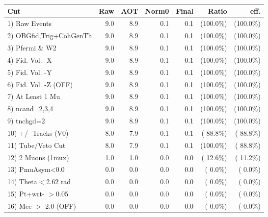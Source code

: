  \begin{table}[h!]\centering
 \begin{tabular}{||l||r|r|r|r|r|r||}
 \hline
 \hline
 Cut & Raw & AOT & Norm0 & Final & Ratio & eff.       \\
 \hline
  1) Raw Events           &          9.0 &          8.9 &          0.1 &          0.1 & (100.0\%) & (100.0\%) \\
  2) OBGfid,Trig+CohGenTh &          9.0 &          8.9 &          0.1 &          0.1 & (100.0\%) & (100.0\%) \\
  3) Pfermi \& W2         &          9.0 &          8.9 &          0.1 &          0.1 & (100.0\%) & (100.0\%) \\
  4) Fid. Vol. -X         &          9.0 &          8.9 &          0.1 &          0.1 & (100.0\%) & (100.0\%) \\
  5) Fid. Vol. -Y         &          9.0 &          8.9 &          0.1 &          0.1 & (100.0\%) & (100.0\%) \\
  6) Fid. Vol. -Z (OFF)   &          9.0 &          8.9 &          0.1 &          0.1 & (100.0\%) & (100.0\%) \\
  7) At Least 1 Mu        &          9.0 &          8.9 &          0.1 &          0.1 & (100.0\%) & (100.0\%) \\
  8) ncand=2,3,4          &          9.0 &          8.9 &          0.1 &          0.1 & (100.0\%) & (100.0\%) \\
  9) tnchgd=2             &          9.0 &          8.9 &          0.1 &          0.1 & (100.0\%) & (100.0\%) \\
 10) +/- Tracks (V0)      &          8.0 &          7.9 &          0.1 &          0.1 & ( 88.8\%) & ( 88.8\%) \\
 11) Tube/Veto Cut        &          8.0 &          7.9 &          0.1 &          0.1 & (100.0\%) & ( 88.8\%) \\
 12) 2 Muons (1mux)       &          1.0 &          1.0 &          0.0 &          0.0 & ( 12.6\%) & ( 11.2\%) \\
 13) PmuAsym<0.0          &          0.0 &          0.0 &          0.0 &          0.0 & (  0.0\%) & (  0.0\%) \\
 14) Theta$<$2.62 rad     &          0.0 &          0.0 &          0.0 &          0.0 & (  0.0\%) & (  0.0\%) \\
 15) Pt+wrt- $>$0.05      &          0.0 &          0.0 &          0.0 &          0.0 & (  0.0\%) & (  0.0\%) \\
 16) Mee $>$ 2.0  (OFF)   &          0.0 &          0.0 &          0.0 &          0.0 & (  0.0\%) & (  0.0\%) \\

\end{tabular}
\end{table}
